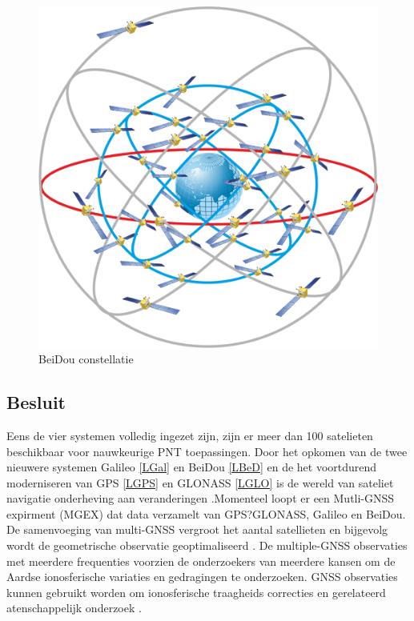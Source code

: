 \begin{figure}[hpb]
	\includegraphics[scale=0.5]{BeiDou.png}
	\caption{BeiDou constellatie \cite{LImgBeiDou}}
	\label{imgBeiDou}
\end{figure} 
\subsection{Besluit}
Eens de vier systemen volledig ingezet zijn, zijn er meer dan 100 satelieten beschikbaar voor nauwkeurige PNT toepassingen. Door het opkomen van de twee nieuwere systemen Galileo \ref{LGal} en BeiDou \ref{LBeD} en de het voortdurend moderniseren van GPS \ref{LGPS} en GLONASS \ref{LGLO} is de wereld van sateliet navigatie onderheving aan veranderingen \cite{LBibGNSS4}.Momenteel loopt er een Mutli-GNSS expirment (MGEX) dat data verzamelt van GPS?GLONASS, Galileo en BeiDou. De samenvoeging van multi-GNSS vergroot het aantal satellieten en bijgevolg wordt de geometrische observatie geoptimaliseerd \cite{LBibGNSS5}. De multiple-GNSS observaties met meerdere frequenties voorzien de onderzoekers van meerdere kansen om de Aardse ionosferische variaties en gedragingen te onderzoeken. GNSS observaties kunnen gebruikt worden om ionosferische traagheids correcties en gerelateerd atenschappelijk onderzoek \cite{LBibBeiDou}.

